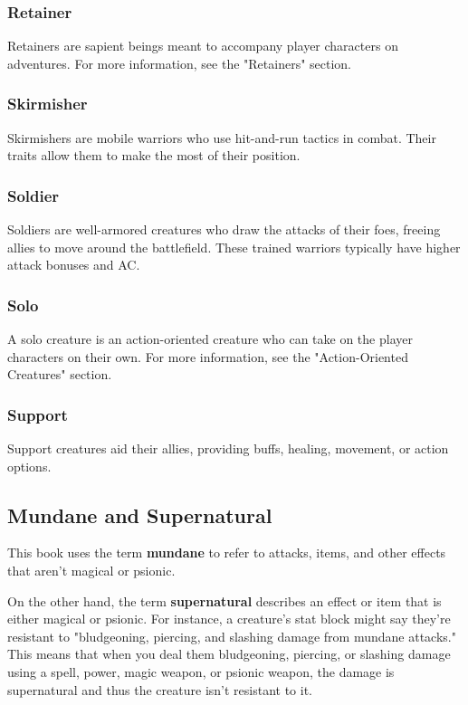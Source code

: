 \documentclass[10pt,a4paper,twoside,bg=print,twocolumn,openany,nodeprecatedcode]{dndbook}
\begin{document}
\subsubsection{Retainer}
Retainers are sapient beings meant to accompany player characters on adventures. For more information, see the "Retainers" section.

\subsubsection{Skirmisher}
Skirmishers are mobile warriors who use hit-and-run tactics in combat. Their traits allow them to make the most of their position.

\subsubsection{Soldier}
Soldiers are well-armored creatures who draw the attacks of their foes, freeing allies to move around the battlefield. These trained warriors typically have higher attack bonuses and AC.

\subsubsection{Solo}
A solo creature is an action-oriented creature who can take on the player characters on their own. For more information, see the "Action-Oriented Creatures" section.

\subsubsection{Support}
Support creatures aid their allies, providing buffs, healing, movement, or action options.

\subsection{Mundane and Supernatural}
This book uses the term \textbf{mundane} to refer to attacks, items, and other effects that aren't magical or psionic.

On the other hand, the term \textbf{supernatural} describes an effect or item that is either magical or psionic. For instance, a creature's stat block might say they're resistant to "bludgeoning, piercing, and slashing damage from mundane attacks." This means that when you deal them bludgeoning, piercing, or slashing damage using a spell, power, magic weapon, or psionic weapon, the damage is supernatural and thus the creature isn't resistant to it.
\end{document}
